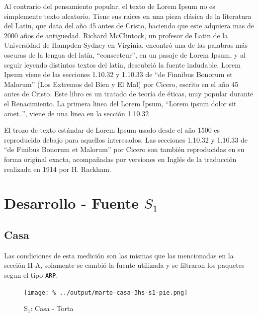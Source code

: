 \documentclass[final,inline,a4paper,narroweqnarray]{ieee}
\begin{document}
Al contrario del pensamiento popular, el texto de Lorem Ipsum no es simplemente texto aleatorio. Tiene sus raices en una pieza clásica de la literatura del Latin, que data del año 45 antes de Cristo, haciendo que este adquiera mas de 2000 años de antiguedad. Richard McClintock, un profesor de Latin de la Universidad de Hampden-Sydney en Virginia, encontró una de las palabras más oscuras de la lengua del latín, ``consecteur'', en un pasaje de Lorem Ipsum, y al seguir leyendo distintos textos del latín, descubrió la fuente indudable. Lorem Ipsum viene de las secciones 1.10.32 y 1.10.33 de ``de Finnibus Bonorum et Malorum'' (Los Extremos del Bien y El Mal) por Cicero, escrito en el año 45 antes de Cristo. Este libro es un tratado de teoría de éticas, muy popular durante el Renacimiento. La primera linea del Lorem Ipsum, ``Lorem ipsum dolor sit amet..'', viene de una linea en la sección 1.10.32

El trozo de texto estándar de Lorem Ipsum usado desde el año 1500 es reproducido debajo para aquellos interesados. Las secciones 1.10.32 y 1.10.33 de ``de Finibus Bonorum et Malorum'' por Cicero son también reproducidas en su forma original exacta, acompañadas por versiones en Inglés de la traducción realizada en 1914 por H. Rackham.




\section{Desarrollo - Fuente $S_1$}
  \subsection{Casa}

  Las condiciones de esta medición son las mismas que las mencionadas en la
  sección II-A, solamente se cambió la fuente utilizada y se filtraron los
  paquetes segun el tipo \texttt{ARP}.

    \begin{figure}[ht]\begin{center}
      \texttt{[image: \%
      ../output/marto-casa-3hs-s1-pie.png]}
      \vspace{-2em}
      \caption{S$_1$: Casa - Torta}
      \label{marto-casa-3hs-s1-pie}
    \end{center}\end{figure}
\end{document}
